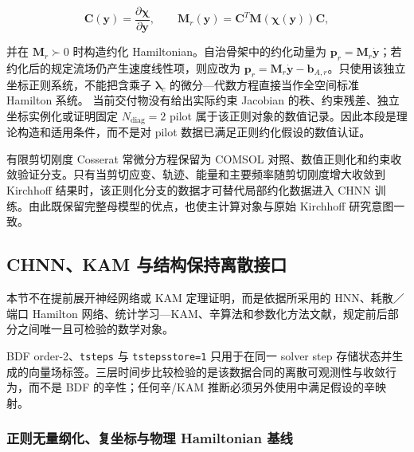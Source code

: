 \begin{equation}
\label{eq:hamiltonian-3-64}
\mathbf{C}\left( \mathbf{y} \right) = \frac{\partial\bm{\chi}}{\partial\mathbf{y}},\quad\quad\mathbf{M}_{r}\left( \mathbf{y} \right) = \mathbf{C}^{T}\mathbf{M}\left( \bm{\chi}\left( \mathbf{y} \right) \right)\mathbf{C},
\end{equation}

并在 \(\mathbf{M}_{r} \succ 0\) 时构造约化 Hamiltonian。自治骨架中的约化动量为 \(\mathbf{p}_{r} = \mathbf{M}_{r}\dot{\mathbf{y}}\)；若约化后的规定流场仍产生速度线性项，则应改为 \(\mathbf{p}_{r} = \mathbf{M}_{r}\dot{\mathbf{y}} - \mathbf{b}_{A,r}\)。只使用该独立坐标正则系统，不能把含乘子 \(\bm{\lambda}_{c}\) 的微分---代数方程直接当作全空间标准 Hamilton 系统。
当前交付物没有给出实际约束 Jacobian 的秩、约束残差、独立坐标实例化或证明固定 \(N_{\mathrm{diag}}=2\) pilot 属于该正则对象的数值记录。因此本段是理论构造和适用条件，而不是对 pilot 数据已满足正则约化假设的数值认证。

有限剪切刚度 Cosserat 常微分方程保留为 COMSOL 对照、数值正则化和约束收敛验证分支。只有当剪切应变、轨迹、能量和主要频率随剪切刚度增大收敛到 Kirchhoff 结果时，该正则化分支的数据才可替代局部约化数据进入 CHNN 训练。由此既保留完整母模型的优点，也使主计算对象与原始 Kirchhoff 研究意图一致。

\subsection{CHNN、KAM 与结构保持离散接口}\label{sec:hamiltonian-3-7}

本节不在提前展开神经网络或 KAM 定理证明，而是依据所采用的 HNN、耗散／端口 Hamilton 网络、统计学习---KAM、辛算法和参数化方法文献，规定前后部分之间唯一且可检验的数学对象\cite{Greydanus2019HNN,Zhong2020Dissipative,Desai2021PHNN,Chen2022KAMSLT,Trabelsi2018DeepComplex,Hirose2012CVNN,FengQin2010,Shang1999KAMAlgorithms,Shang2000KAMMappings,Haro2016Parameterization}。

BDF order-2、\texttt{tsteps} 与 \texttt{tstepsstore=1} 只用于在同一 solver step 存储状态并生成的向量场标签。三层时间步比较检验的是该数据合同的离散可观测性与收敛行为，而不是 BDF 的辛性；任何辛/KAM 推断必须另外使用中满足假设的辛映射。

\subsubsection{正则无量纲化、复坐标与物理 Hamiltonian 基线}\label{sec:hamiltonian-3-7-1}

